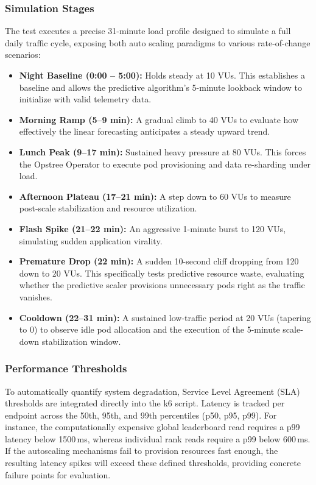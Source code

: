 \subsubsection{Simulation Stages}
\label{subsubsec:simulation}
    The test executes a precise 31-minute load profile designed to simulate a full daily traffic cycle, exposing both auto
    scaling paradigms to various rate-of-change scenarios:
    \begin{itemize}
        \item \textbf{Night Baseline (0:00 -- 5:00):} Holds steady at 10 VUs. This establishes a baseline and allows the predictive algorithm's 5-minute lookback window to initialize with valid telemetry data.
        \item \textbf{Morning Ramp (5--9 min):} A gradual climb to 40 VUs to evaluate how effectively the linear forecasting anticipates a steady upward trend.
        \item \textbf{Lunch Peak (9--17 min):} Sustained heavy pressure at 80 VUs. This forces the Opstree Operator to execute pod provisioning and data re-sharding under load.
        \item \textbf{Afternoon Plateau (17--21 min):} A step down to 60 VUs to measure post-scale stabilization and resource utilization.
        \item \textbf{Flash Spike (21--22 min):} An aggressive 1-minute burst to 120 VUs, simulating sudden application virality.
        \item \textbf{Premature Drop (22 min):} A sudden 10-second cliff dropping from 120 down to 20 VUs. This specifically tests predictive resource waste, evaluating whether the predictive scaler provisions unnecessary pods right as the traffic vanishes.
        \item \textbf{Cooldown (22--31 min):} A sustained low-traffic period at 20 VUs (tapering to 0) to observe idle pod allocation and the execution of the 5-minute scale-down stabilization window.
    \end{itemize}

\subsubsection{Performance Thresholds}
\label{subsubsec:performance}
    To automatically quantify system degradation, Service Level Agreement (SLA) thresholds are integrated directly into the k6 script. Latency is tracked per endpoint across the 50th, 95th, and 99th percentiles (p50, p95, p99). For instance, the computationally expensive global leaderboard read requires a p99 latency below 1500\,ms, whereas individual rank reads require a p99 below 600\,ms. If the autoscaling mechanisms fail to provision resources fast enough, the resulting latency spikes will exceed these defined thresholds, providing concrete failure points for evaluation.

